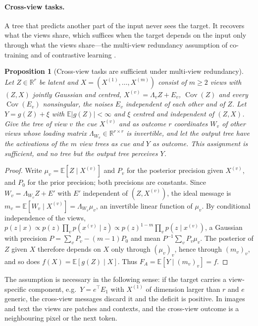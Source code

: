 \documentclass[11pt]{article}
\newtheorem{proposition}[theorem]{Proposition}
\theoremstyle{definition}
\theoremstyle{remark}
\newcommand{\R}{\mathbb{R}}
\newcommand{\E}{\mathbb{E}}
\begin{document}
\paragraph{Cross-view tasks.}
A tree that predicts another part of the input never sees the target.  It recovers what
the views share, which suffices when the target depends on the input only through what
the views share---the multi-view redundancy assumption of co-training and of
contrastive learning \citep{blum1998,tosh2021}.

\begin{proposition}[Cross-view tasks are sufficient under multi-view redundancy]\label{prop:multiview}
Let $Z\in\R^r$ be latent and $X=(X^{(1)},\dots,X^{(m)})$ consist of $m\ge2$ views with
$(Z,X)$ jointly Gaussian and centred, $X^{(v)}=\Lambda_vZ+E_v$, $\operatorname{Cov}(Z)$ and
every $\operatorname{Cov}(E_v)$ nonsingular, the noises $E_v$ independent of each other and
of $Z$.  Let $Y=g(Z)+\xi$ with $\E|g(Z)|<\infty$ and $\xi$
centred and independent of $(Z,X)$.  Give the tree of view $v$ the cue $X^{(v)}$ and as
outcome $r$ coordinates $W_v$ of other views whose loading matrix $\Lambda_{W_v}\in\R^{r\times r}$
is invertible, and let the output tree have the activations of the $m$ view trees as cue
and $Y$ as outcome.  This assignment is sufficient, and no tree but the output tree
perceives $Y$.
\end{proposition}
\begin{proof}
Write $\mu_v=\E[Z\mid X^{(v)}]$ and $P_v$ for the posterior precision given $X^{(v)}$, and
$P_0$ for the prior precision; both precisions are constants.  Since $W_v=\Lambda_{W_v}Z+E'$
with $E'$ independent of $(Z,X^{(v)})$, the ideal message is
$m_v=\E[W_v\mid X^{(v)}]=\Lambda_{W_v}\mu_v$, an invertible linear function of $\mu_v$.
By conditional independence of the views,
$p(z\mid x)\propto p(z)\prod_vp(x^{(v)}\mid z)\propto p(z)^{1-m}\prod_vp(z\mid x^{(v)})$,
a Gaussian with precision $P=\sum_vP_v-(m-1)P_0$ and mean $P^{-1}\sum_vP_v\mu_v$.  The
posterior of $Z$ given $X$ therefore depends on $X$ only through $(\mu_v)_v$, hence through
$(m_v)_v$, and so does $f(X)=\E[g(Z)\mid X]$.  Thus $F_A=\E[Y\mid(m_v)_v]=f$.
\end{proof}

The assumption is necessary in the following sense: if the target carries a
view-specific component, e.g.\ $Y=e^\top E_1$ with $X^{(1)}$ of dimension larger than
$r$ and $e$ generic, the cross-view messages discard it and the deficit is positive.  In images and text the
views are patches and contexts, and the cross-view outcome is a neighbouring pixel or
the next token.
\end{document}

